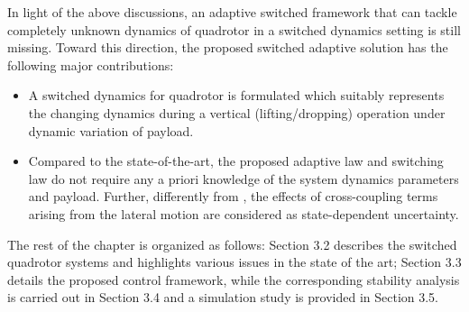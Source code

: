 In light of the above discussions, an adaptive switched framework that can tackle completely unknown dynamics of quadrotor in a switched dynamics setting is still missing. Toward this direction, the proposed switched adaptive solution has the following major contributions:
\begin{itemize}
	\item A switched dynamics for quadrotor is formulated which suitably represents the changing dynamics during a vertical (lifting/dropping) operation under dynamic variation of payload.
	\item Compared to the state-of-the-art, the proposed adaptive law and switching law do not require any a priori knowledge of the system dynamics parameters and payload. Further, differently from \cite{nicol2011robust, mofid2018adaptive}, the effects of cross-coupling terms arising from the lateral motion are considered as state-dependent uncertainty. 
	
	
\end{itemize} 

The rest of the chapter is organized as follows: Section 3.2 describes the switched quadrotor systems and highlights various issues in the state of the art; Section 3.3 details the proposed control framework, while the corresponding stability analysis is carried out in Section 3.4 and a simulation study is provided in Section 3.5.
